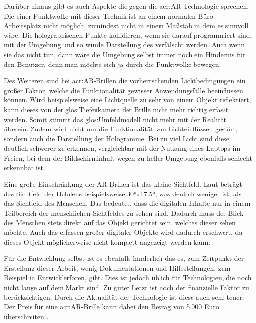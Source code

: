 Darüber hinaus gibt es auch Aspekte die gegen die \acrshort{acr:AR}-Technologie sprechen. Die  einer Punktwolke mit dieser Technik ist an einem normalen Büro-Arbeitsplatz nicht möglich, zumindest nicht in einem Maßstab in dem es sinnvoll wäre. Die holographischen Punkte kollidieren, wenn sie darauf programmiert sind, mit der Umgebung und so würde Darstellung des  verfälscht werden. Auch wenn sie das nicht tun, dann wäre die Umgebung selbst immer noch ein Hindernis für den Benutzer, denn man möchte sich ja durch die Punktwolke bewegen. 

Des Weiteren sind bei \acrshort{acr:AR}-Brillen die vorherrschenden Lichtbedingungen ein großer Faktor, welche die Funktionalität gewisser Anwendungsfälle beeinflussen können. Wird beispielsweise eine Lichtquelle zu sehr von einem Objekt reflektiert, kann dieses von der \gls{glos:Tiefenkamera} der Brille nicht mehr richtig erfasst werden. Somit stimmt das \gls{glos:Umfeldmodell} nicht mehr mit der Realität überein. Zudem wird nicht nur die Funktionalität von Lichteinflüssen gestört, sondern auch die Darstellung der Hologramme. Bei zu viel Licht sind diese deutlich schwerer zu erkennen, vergleichbar mit der Nutzung eines Laptops im Freien, bei dem der Bildschirminhalt wegen zu heller Umgebung ebenfalls schlecht erkennbar ist. 

Eine große Einschränkung der AR-Brillen ist das kleine Sichtfeld. Laut \cite{bib:HoloFOV} beträgt das Sichtfeld der Hololens beispielsweise 30°x17.5°, was deutlch weniger ist, als das Sichtfeld des Menschen. Das bedeutet, dass die digitalen Inhalte nur in einem Teilbereich der menschlichen Sichtfeldes zu sehen sind. Dadurch muss der Blick des Menschen stets direkt auf das Objekt gerichtet sein, welches dieser sehen möchte. Auch das erfassen großer digitaler Objekte wird dadurch erschwert, da dieses Objekt möglicherweise nicht komplett angezeigt werden kann.

Für die Entwicklung selbst ist es ebenfalls hinderlich das es, zum Zeitpunkt der Erstellung dieser Arbeit, wenig Dokumentationen und Hilfestellungen, zum Beispiel in Entwicklerforen, gibt. Dies ist jedoch üblich für Technologien, die noch nicht lange auf dem Markt sind. Zu guter Letzt ist noch der finanzielle Faktor zu berücksichtigen. Durch die Aktualität der Technologie ist diese auch sehr teuer. Der Preis für eine \acrshort{acr:AR}-Brille kann dabei den Betrag von 5.000 Euro überschreiten \cite{bib:HololensPreis}.   


